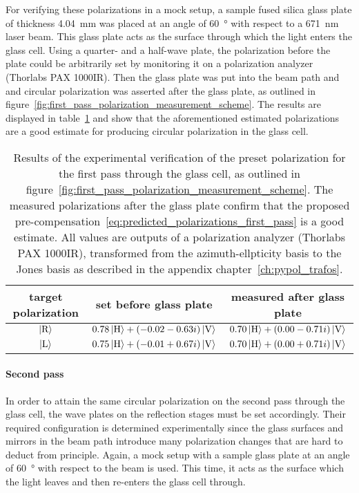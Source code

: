 For verifying these polarizations in a mock setup, a sample fused silica glass plate of thickness \SI{4.04}{\milli\meter} was placed at an angle of \SI{60}{\degree} with respect to a \SI{671}{\nano\meter} laser beam. This glass plate acts as the surface through which the light enters the glass cell. Using a quarter- and a half-wave plate, the polarization before the plate could be arbitrarily set by monitoring it on a polarization analyzer (Thorlabs PAX 1000IR). Then the glass plate was put into the beam path and and circular polarization was asserted after the glass plate, as outlined in figure~\ref{fig:first_pass_polarization_measurement_scheme}. The results are displayed in table~\ref{tab:polarization_first_pass} and show that the aforementioned estimated polarizations  are a good estimate for producing circular polarization in the glass cell.

\begin{table}
    \centering
    \begin{tabular}{ccc}
        \toprule
        \textbf{target polarization} & \textbf{set before glass plate} & \textbf{measured after glass plate} \\
        \toprule
        $\Ket{\text{R}}$ & $0.78 \Ket{\text{H}} + (-0.02-0.63i) \Ket{\text{V}}$ & $0.70 \Ket{\text{H}} +(0.00-0.71i)\Ket{\text{V}}$ \\
        $\Ket{\text{L}}$ & $0.75 \Ket{\text{H}} + (-0.01+0.67i)\Ket{\text{V}}$ & $0.70 \Ket{\text{H}} + (0.00+0.71i)\Ket{\text{V}}$ \\
        \bottomrule
    \end{tabular}
    \caption{Results of the experimental verification of the preset polarization for the first pass through the glass cell, as outlined in figure~\ref{fig:first_pass_polarization_measurement_scheme}. The measured polarizations after the glass plate confirm that the proposed pre-compensation~\eqref{eq:predicted_polarizations_first_pass} is a good estimate. All values are outputs of a polarization analyzer (Thorlabs PAX 1000IR), transformed from the azimuth-ellpticity basis to the Jones basis as described in the appendix chapter~\ref{ch:pypol_trafos}.}
    \label{tab:polarization_first_pass}
\end{table}

\paragraph{Second pass}
In order to attain the same circular polarization on the second pass through the glass cell, the wave plates on the reflection stages must be set accordingly. Their required configuration is determined experimentally since the glass surfaces and mirrors in the beam path introduce many polarization changes that are hard to deduct from principle. Again, a mock setup with a sample glass plate at an angle of \SI[]{60}{\degree} with respect to the beam is used. This time, it acts as the surface which the light leaves and then re-enters the glass cell through.

